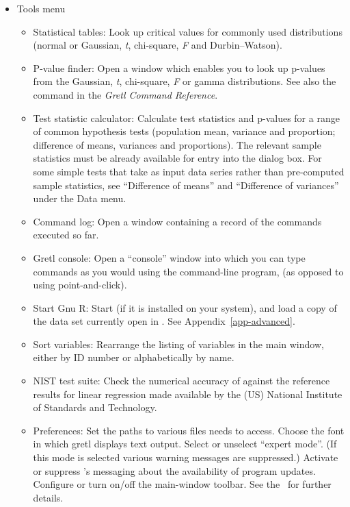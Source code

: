 \begin{itemize}
\item \textsf{Tools menu}
  \begin{itemize}
  \item \textsf{Statistical tables}: Look up critical values for
    commonly used distributions (normal or Gaussian, \emph{t},
    chi-square, \emph{F} and Durbin--Watson).
  \item \textsf{P-value finder}: Open a window which enables you to
    look up p-values from the Gaussian, \emph{t}, chi-square, \emph{F}
    or gamma distributions. See also the  command in the
    \emph{Gretl Command Reference}.
  \item \textsf{Test statistic calculator}: Calculate test statistics
    and p-values for a range of common hypothesis tests (population
    mean, variance and proportion; difference of means, variances and
    proportions).  The relevant sample statistics must be already
    available for entry into the dialog box. For some simple tests
    that take as input data series rather than pre-computed sample
    statistics, see ``Difference of means'' and ``Difference of
    variances'' under the Data menu.
  \item \textsf{Command log}: Open a window containing a record
    of the commands executed so far.
  \item \textsf{Gretl console}: Open a ``console'' window into which
    you can type commands as you would using the command-line program,
     (as opposed to using point-and-click).
  \item \textsf{Start Gnu R}: Start  (if it is installed on
    your system), and load a copy of the data set currently open in
    .  See Appendix~\ref{app-advanced}.
  \item \textsf{Sort variables}: Rearrange the listing of variables in
    the main window, either by ID number or alphabetically by name.
  \item \textsf{NIST test suite}: Check the numerical accuracy of
     against the reference results for linear regression
    made available by the (US) National Institute of Standards and
    Technology.
  \item \textsf{Preferences}: Set the paths to various files
     needs to access. Choose the font in which gretl
    displays text output.  Select or unselect ``expert mode''. (If
    this mode is selected various warning messages are suppressed.)
    Activate or suppress 's messaging about the
    availability of program updates.  Configure or turn on/off the
    main-window toolbar. See the \GCR\ for
    further details.
  \end{itemize}


\end{itemize}
